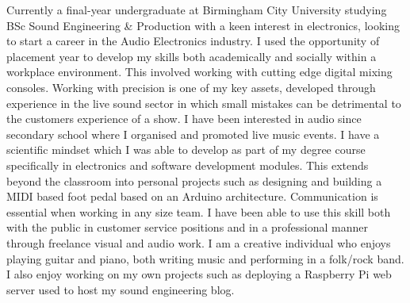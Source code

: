 \documentclass[9pt]{developercv} %
\begin{document}
\begin{minipage}[t]{1\textwidth} %
	\vspace{-\baselineskip} %
Currently a final-year undergraduate at Birmingham City University studying BSc Sound Engineering \& Production with a keen interest in electronics, looking to start a career in the Audio Electronics industry. I used the opportunity of placement year to develop my skills both academically and socially within a workplace environment. This involved working with cutting edge digital mixing consoles. 
\newline
\newline
Working with precision is one of my key assets, developed through experience in the live sound sector in which small mistakes can be detrimental to the customers experience of a show. I have been interested in audio since secondary school where I organised and promoted live music events.
\newline
\newline
I have a scientific mindset which I was able to develop as part of my degree course specifically in electronics and software development modules. This extends beyond the classroom into personal projects such as designing and building a MIDI based foot pedal based on an Arduino architecture.
\newline
\newline
Communication is essential when working in any size team. I have been able to use this skill both with the public in customer service positions and in a professional manner through freelance visual and audio work.
\newline
\newline
I am a creative individual who enjoys playing guitar and piano, both writing music and performing in a folk/rock band. I also enjoy working on my own projects such as deploying a Raspberry Pi web server used to host my sound engineering blog.
\end{minipage}
\hfill %



\end{document}
